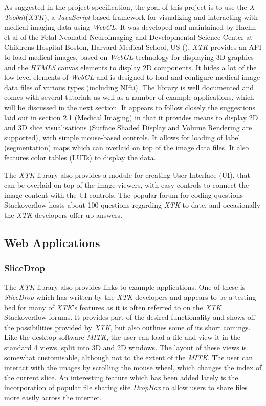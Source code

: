 \documentclass[a4paper,11pt,titlepage]{article}
\begin{document}
As suggested in the project specification, the goal of this project is to use the \textit{X Toolkit}(\textit{XTK}), a \textit{JavaScript}-based framework for visualizing and interacting with medical imaging data using \textit{WebGL}. It was developed and maintained by Haehn et al of the Fetal-Neonatal Neuroimaging and Developmental Science Center at Childrens Hospital Boston, Harvard Medical School, US (\cite{xtk}). \textit{XTK} provides an API to load medical images, based on \textit{WebGL} technology for displaying 3D graphics and the \textit{HTML5} canvas elements to display 2D components. It hides a lot of the low-level elements of \textit{WebGL} and is designed to load and configure medical image data files of various types (including NIfti). The library is well documented and comes with several tutorials as well as a number of example applications, which will be discussed in the next section. It appears to follow closely the suggestions laid out in section 2.1 (Medical Imaging) in that it provides means to display 2D and 3D slice visualisations (Surface Shaded Display and Volume Rendering are supported), with simple mouse-based controls. It allows for loading of label (segmentation) maps which can overlaid on top of the image data files. It also features color tables (LUTs) to display the data.

The \textit{XTK} library also provides a module for creating User Interface (UI), that can be overlaid on top of the image viewers, with easy controls to connect the image content with the UI controls.
The popular forum for coding questions Stackoverflow hosts about 100 questions regarding \textit{XTK} to date, and occasionally the \textit{XTK} developers offer up answers.


\subsection{Web Applications}

\subsubsection{SliceDrop}
The \textit{XTK} library also provides links to example applications. One of these is \textit{SliceDrop}\cite{slicedrop} which has written by the \textit{XTK} developers and appears to be a testing bed for many of \textit{XTK}'s features as it is often referred to on the \textit{XTK} Stackoverflow forums. It provides part of the desired functionality and shows off the possibilities provided by \textit{XTK}, but also outlines some of its short comings. Like the desktop software \textit{MITK}, the user can load a file and view it in the standard 4 views, split into 3D and 2D windows. The layout of these views is somewhat customisable, although not to the extent of the \textit{MITK}. The user can interact with the images by scrolling the mouse wheel, which changes the index of the current slice. An interesting feature which has been added lately is the incorporation of popular file sharing site \textit{DropBox} to allow users to share files more easily across the internet.
\end{document}
